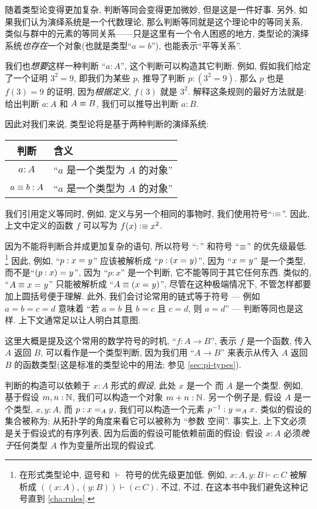 随着类型论变得更加复杂, 判断等同会变得更加微妙, 但是这是一件好事. 另外, 如果我们认为演绎系统是一个代数理论, 那么判断等同就是这个理论中的等同关系, 类似与群中的元素的等同关系——只是这里有一个令人困惑的地方, 类型论的演绎系统\emph{也}\emph{存在}一个对象(也就是类型``$a=b$''), 也能表示``平等关系''. 

我们也\emph{想要}这样一种判断 ``$a:A$'', 这个判断可以构造其它判断. 例如, 假如我们给定了一个证明 $3^2=9$, 即我们为某些 $p$, 推导了判断 $p:(3^2=9)$. 那么 $p$ 也是 $f(3)=9$ 的证明, 因为\emph{根据定义}, $f(3)$ 就是 $3^2$. 解释这条规则的最好方法就是: 给出判断 $a:A$ 和 $A\jdeq B$, 我们可以推导出判断 $a:B$.

因此对我们来说, 类型论将是基于两种判断的演绎系统:  \begin{center}
\medskip
\begin{tabular}{cl}
\toprule
判断 &含义\\
\midrule
$a : A$ &``$a$ 是一个类型为 $A$  的对象''\\
$a \jdeq b : A$ &``$a$ 是一个类型为 $A$ 的对象''\\
\bottomrule
\end{tabular}
\medskip
\end{center}
%
%
我们引用定义等同时, 例如, 定义与另一个相同的事物时, 我们使用符号``$\defeq$''. 因此, 上文中定义的函数 $f$ 可以写为 $f(x)\defeq x^2$. 

因为不能将判断合并成更加复杂的语句, 所以符号 ``$:$'' 和符号 ``$\jdeq$'' 的优先级最低. \footnote{在形式类型论中, 逗号和 $\vdash$ 符号的优先级更加低.%
例如, $x:A,y:B\vdash c:C$ 被解析成 $((x:A),(y:B))\vdash (c:C)$.
不过, 不过, 在这本书中我们避免这种记号直到 \cref{cha:rules}.}
因此, 例如, ``$p:\id{x}{y}$'' 应该被解析成 ``$p:(\id{x}{y})$'', 因为 ``$\id{x}{y}$'' 是一个类型, 而不是``$\id{(p:x)}{y}$'', 因为 ``$p:x$'' 是一个判断, 它不能等同于其它任何东西. 类似的, ``$A\jdeq \id{x}{y}$'' 只能被解析成 ``$A\jdeq(\id{x}{y})$'',  尽管在这种极端情况下, 不管怎样都要加上圆括号便于理解. 此外, 我们会讨论常用的链式等于符号 --- 例如 $a=b=c=d$ 意味着 ``若 $a=b$ 且 $b=c$ 且 $c=d$, 则 $a=d$'' --- 判断等同也是这样. 上下文通常足以让人明白其意图.

这里大概是提及这个常用的数学符号的时机, ``$f:A\to B$'', 表示 $f$ 是一个函数, 传入 $A$ 返回 $B$, 可以看作是一个类型判断, 因为我们用  ``$A\to B$'' 来表示从传入 $A$ 返回 $B$ 的函数类型(这是标准的类型论中的用法; 参见 \cref{sec:pi-types}). 

%
判断的构造可以依赖于 $x:A$ 形式的\emph{假设}, 此处 $x$ 是一个 %
而 $A$ 是一个类型. 例如, 基于假设 $m,n : \nat$, 我们可以构造一个对象 $m + n : \nat$. 另一个例子是, 假设 $A$ 是一个类型, $x,y : A$, 而  $p : \id[A]{x}{y}$, 我们可以构造一个元素 $p^{-1} : \id[A]{y}{x}$. 类似的假设的集合被称为; %
从拓扑学的角度来看它可以被称为 ``参数 空间''. 事实上, 上下文必须是关于假设式的有序列表, 因为后面的假设可能依赖前面的假设: 假设 $x:A$ 必须\emph{晚于}任何类型 $A$ 作为变量所出现的假设式. 

